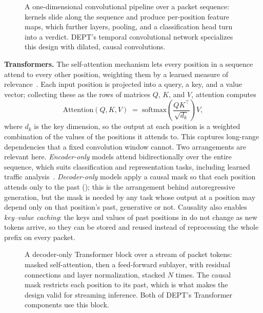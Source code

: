 \begin{figure}[htbp]
    \centering
    
    \caption[The one-dimensional convolutional pipeline.]{A one-dimensional convolutional pipeline over a packet sequence: kernels slide along the sequence and produce per-position feature maps, which further layers, pooling, and a classification head turn into a verdict. DEPT's temporal convolutional network specializes this design with dilated, causal convolutions.}
    \label{fig:bg-1dcnn}
\end{figure}

\textbf{Transformers.}
The self-attention mechanism lets every position in a sequence attend to every other
position, weighting them by a learned measure of
relevance~\cite{vaswani2017attention}. Each input position is projected into a query, a
key, and a value vector; collecting these as the rows of matrices $Q$, $K$, and $V$,
attention computes
\begin{equation}
    \mathrm{Attention}(Q, K, V) \;=\; \mathrm{softmax}\!\left(\frac{QK^{\top}}{\sqrt{d_k}}\right)V,
    \label{eq:bg-attention}
\end{equation}
where $d_k$ is the key dimension, so the output at each position is a weighted combination
of the values of the positions it attends to. This captures long-range dependencies that a
fixed convolution window cannot. Two arrangements are relevant here. \emph{Encoder-only}
models attend bidirectionally over the entire sequence, which suits classification and
representation tasks, including learned traffic
analysis~\cite{lin2022bert,ghadermazi2025gtae}. \emph{Decoder-only} models apply a causal
mask so that each position attends only to the past (); this is
the arrangement behind autoregressive generation, but the mask is needed by any task whose
output at a position may depend only on that position's past, generative or not.
Causality also enables \emph{key--value caching}: the keys and values of past positions in
 do not change as new tokens arrive, so they can be stored and reused
instead of reprocessing the whole prefix on every packet.

\begin{figure}[htbp]
    \centering
    
    \caption[The decoder-only Transformer block.]{A decoder-only Transformer block over a stream of packet tokens: masked self-attention, then a feed-forward sublayer, with residual connections and layer normalization, stacked $N$ times. The causal mask restricts each position to its past, which is what makes the design valid for streaming inference. Both of DEPT's Transformer components use this block.}
    \label{fig:bg-transformer}
\end{figure}

